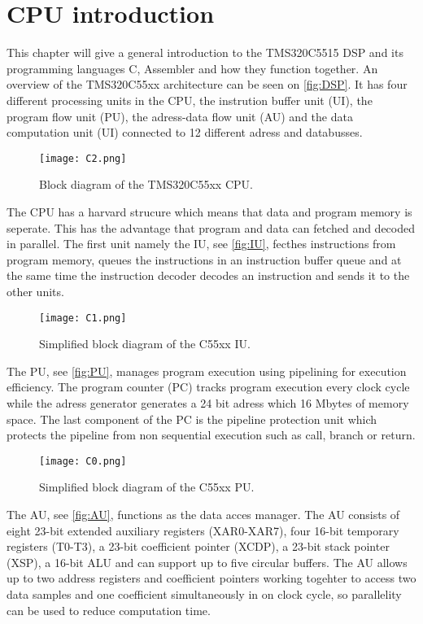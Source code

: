 \chapter{CPU introduction}
This chapter will give a general introduction to the TMS320C5515 DSP and its programming languages C, Assembler and how they function together. An overview of the TMS320C55xx architecture can be seen on \autoref{fig:DSP}. It has four different processing units in the CPU, the instrution buffer unit (UI), the program flow unit (PU), the adress-data flow unit (AU) and the data computation unit (UI) connected to 12 different adress and databusses.  
\begin{figure}[H]
\centering
\texttt{[image: C2.png]}
\caption{Block diagram of the TMS320C55xx CPU.}
\label{fig:DSP}
\end{figure}
The CPU has a harvard strucure which means that data and program memory is seperate. This has the advantage that program and data can fetched and decoded in parallel. The first unit namely the IU, see \autoref{fig:IU}, fecthes instructions from program memory, queues the instructions in an instruction buffer queue and at the same time the instruction decoder decodes an instruction and sends it to the other units.
\begin{figure}[H]
\centering
\texttt{[image: C1.png]}
\caption{Simplified block diagram of the C55xx IU.}
\label{fig:IU}
\end{figure}
The PU, see \autoref{fig:PU}, manages program execution using pipelining for execution efficiency. The program counter (PC) tracks program execution every clock cycle while the adress generator generates a 24 bit adress which 16 Mbytes of memory space. The last component of the PC is the pipeline protection unit which protects the pipeline from non sequential execution such as call, branch or return.
\begin{figure}[H]
\centering
\texttt{[image: C0.png]}
\caption{Simplified block diagram of the C55xx PU.}
\label{fig:PU}
\end{figure}
The AU, see \autoref{fig:AU}, functions as the data acces manager. The AU consists of eight 23-bit extended auxiliary registers (XAR0-XAR7), four 16-bit temporary registers (T0-T3), a 23-bit coefficient pointer (XCDP), a 23-bit stack pointer (XSP), a 16-bit ALU and can support up to five circular buffers. The AU allows up to two address registers and coefficient pointers working togehter to access two data samples and one coefficient simultaneously in on clock cycle, so parallelity can be used to reduce computation time. 
